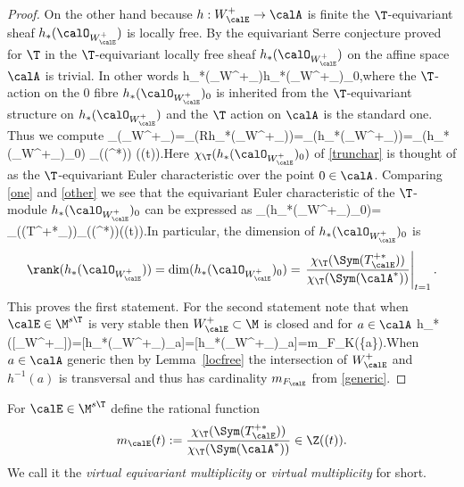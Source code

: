 \begin{proof}
	On the other hand because $h:W^+_{\calE}\to \calA$ is finite the $\T$-equivariant sheaf $h_*(\calO_{W^+_\calE})$ is locally free. By the equivariant  Serre conjecture proved for $\T$ in \cite{equserre} the $\T$-equivariant locally free sheaf $h_*(\calO_{W^+_\calE})$ on the affine space $\calA$ is trivial. In other words \beq\label{hitchinpush}h_*(\calO_{W^+_\calE})\cong h_*(\calO_{W^+_\calE})_0\times \calA,\eeq where the $\T$-action on the $0$ fibre  $h_*(\calO_{W^+_\calE})_0$ is inherited from the $\T$-equivariant structure on $h_*(\calO_{W^+_\calE})$ and the $\T$ action on $\calA$ is the standard one.  Thus we  compute \beq \label{other}\chi_\T(\calO_{W^+_\calE})=\chi_\T(Rh_*(\calO_{W^+_\calE}))=\chi_\T(h_*(\calO_{W^+_\calE}))=\chi_\T(h_*(\calO_{W^+_\calE})_0) \chi_\T(\Sym(\calA^*)) \in \Z((t)).\eeq Here  $\chi_\T(h_*(\calO_{W^+_\calE})_0)$ of \eqref{trunchar} is thought of as the $\T$-equivariant Euler characteristic over the point $0\in \calA$.
	Comparing \eqref{one} and \eqref{other} we see that the equivariant Euler characteristic of the $\T$-module $h_*(\calO_{W^+_\calE})_0$ can be expressed as \beq \label{t-character}\chi_\T(h_*(\calO_{W^+_\calE})_0)={ \chi_\T(\Sym(T^{+*}_\calE))\over \chi_\T(\Sym(\calA^*))}\in \Z((t)).\eeq In particular, the dimension of $h_*(\calO_{W^+_\calE})_0$ is $$\rank(h_*(\calO_{W^+_\calE}))=\dim(h_*(\calO_{W^+_\calE})_0)=\left. { \chi_\T(\Sym(T^{+*}_\calE))\over \chi_\T(\Sym(\calA^*))}\right|_{t=1}.$$
	This proves the first statement. For the second statement note that
	when $\calE\in \M^{s\T}$ is very stable then $W^+_\calE\subset \M$ is closed and for   $a\in\calA$ \beq \label{generic}h_*([\calO_{W^+_\calE}]\cap [h^{-1}(a)])=[h_*(\calO_{W^+_\calE})\cap \calO_a]=[h_*(\calO_{W^+_\calE})_a]=m_{F_\calE}\in K(\{a\})\cong \Z.\eeq When $a\in \calA$ generic then by Lemma~\ref{locfree} the intersection of $W^+_\calE$ and $h^{-1}(a)$ is transversal and thus has cardinality $m_{F_\calE}$ from \eqref{generic}.


\end{proof}

\begin{definition}
\notready\label{equmult} For $\calE\in \M^{s
		\T}$ define the rational function $$m_{\calE}(t):={{ \chi_\T(\Sym(T^{+*}_\calE))\over \chi_\T(\Sym(\calA^*))}}\in \Z((t)).$$ %
	We call it the {\em virtual equivariant multiplicity} or {\em virtual multiplicity} for short.
\end{definition}

